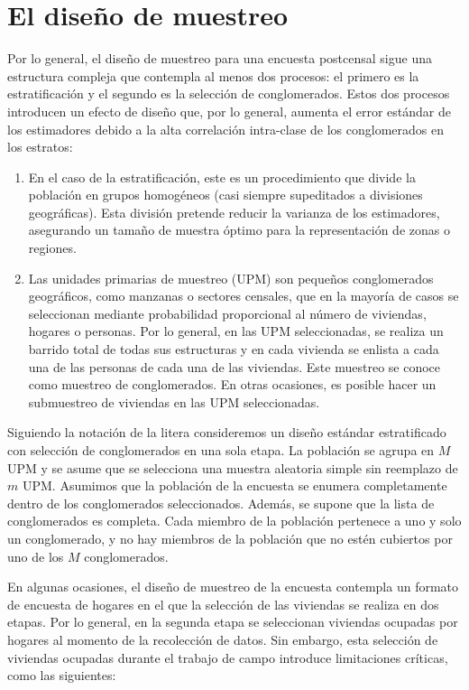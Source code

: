 \documentclass[
  12pt,
]{book}
\providecommand{\tightlist}{%
  \setlength{\itemsep}{0pt}\setlength{\parskip}{0pt}}
\begin{document}
\section{El diseño de muestreo}\label{el-diseuxf1o-de-muestreo}

Por lo general, el diseño de muestreo para una encuesta postcensal sigue una estructura compleja que contempla al menos dos procesos: el primero es la estratificación y el segundo es la selección de conglomerados. Estos dos procesos introducen un efecto de diseño que, por lo general, aumenta el error estándar de los estimadores debido a la alta correlación intra-clase de los conglomerados en los estratos:

\begin{enumerate}
\def\labelenumi{\arabic{enumi}.}
\tightlist
\item
  En el caso de la estratificación, este es un procedimiento que divide la población en grupos homogéneos (casi siempre supeditados a divisiones geográficas). Esta división pretende reducir la varianza de los estimadores, asegurando un tamaño de muestra óptimo para la representación de zonas o regiones.
\item
  Las unidades primarias de muestreo (UPM) son pequeños conglomerados geográficos, como manzanas o sectores censales, que en la mayoría de casos se seleccionan mediante probabilidad proporcional al número de viviendas, hogares o personas. Por lo general, en las UPM seleccionadas, se realiza un barrido total de todas sus estructuras y en cada vivienda se enlista a cada una de las personas de cada una de las viviendas. Este muestreo se conoce como muestreo de conglomerados. En otras ocasiones, es posible hacer un submuestreo de viviendas en las UPM seleccionadas.
\end{enumerate}

Siguiendo la notación de la litera consideremos un diseño estándar estratificado con selección de conglomerados en una sola etapa. La población se agrupa en \(M\) UPM y se asume que se selecciona una muestra aleatoria simple sin reemplazo de \(m\) UPM. Asumimos que la población de la encuesta se enumera completamente dentro de los conglomerados seleccionados. Además, se supone que la lista de conglomerados es completa. Cada miembro de la población pertenece a uno y solo un conglomerado, y no hay miembros de la población que no estén cubiertos por uno de los \(M\) conglomerados.

En algunas ocasiones, el diseño de muestreo de la encuesta contempla un formato de encuesta de hogares en el que la selección de las viviendas se realiza en dos etapas. Por lo general, en la segunda etapa se seleccionan viviendas ocupadas por hogares al momento de la recolección de datos. Sin embargo, esta selección de viviendas ocupadas durante el trabajo de campo introduce limitaciones críticas, como las siguientes:
\end{document}
